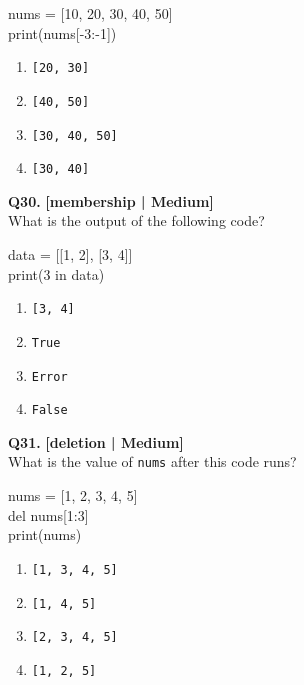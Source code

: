 \begin{pycode}
nums = [10, 20, 30, 40, 50]\\
print(nums[-3:-1])
\end{pycode}

\begin{enumerate}[label=(\alph*),topsep=2pt,itemsep=1pt,partopsep=0pt,parsep=0pt]
    \item \relax \texttt{[20, 30]}
    \item \relax \texttt{[40, 50]}
    \item \relax \texttt{[30, 40, 50]}
    \item \relax \texttt{[30, 40]}
\end{enumerate}
\vspace{2mm}

\noindent\textbf{Q30.} \hfill {\small\color{LPUOrange}\textbf{[membership | Medium]}}\\[2pt]
What is the output of the following code? 

\begin{pycode}
data = [[1, 2], [3, 4]]\\
print(3 in data)
\end{pycode}

\begin{enumerate}[label=(\alph*),topsep=2pt,itemsep=1pt,partopsep=0pt,parsep=0pt]
    \item \relax \texttt{[3, 4]}
    \item \relax \texttt{True}
    \item \relax \texttt{Error}
    \item \relax \texttt{False}
\end{enumerate}
\vspace{2mm}

\noindent\textbf{Q31.} \hfill {\small\color{LPUOrange}\textbf{[deletion | Medium]}}\\[2pt]
What is the value of \texttt{nums} after this code runs? 

\begin{pycode}
nums = [1, 2, 3, 4, 5]\\
del nums[1:3]\\
print(nums)
\end{pycode}

\begin{enumerate}[label=(\alph*),topsep=2pt,itemsep=1pt,partopsep=0pt,parsep=0pt]
    \item \relax \texttt{[1, 3, 4, 5]}
    \item \relax \texttt{[1, 4, 5]}
    \item \relax \texttt{[2, 3, 4, 5]}
    \item \relax \texttt{[1, 2, 5]}
\end{enumerate}
\vspace{2mm}

